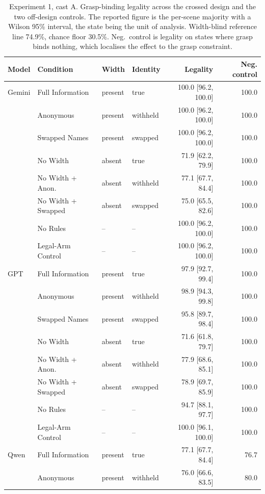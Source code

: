 \begin{table}[H]
  \centering
  \caption{Experiment 1, cast A. Grasp-binding legality across the crossed design and the two off-design controls. The reported figure is the per-scene majority with a Wilson 95\% interval, the state being the unit of analysis. Width-blind reference line 74.9\%, chance floor 30.5\%. Neg.\ control is legality on states where grasp binds nothing, which localises the effect to the grasp constraint.}
  \label{tab:ex1:design}
  \small
  \begin{tabular}{llllrr}
    \toprule
    Model & Condition & Width & Identity & Legality & Neg. control \\
    \midrule
    Gemini & Full Information & present & true & 100.0 [96.2, 100.0] & 100.0 \\
     & Anonymous & present & withheld & 100.0 [96.2, 100.0] & 100.0 \\
     & Swapped Names & present & swapped & 100.0 [96.2, 100.0] & 100.0 \\
     & No Width & absent & true & 71.9 [62.2, 79.9] & 100.0 \\
     & No Width + Anon. & absent & withheld & 77.1 [67.7, 84.4] & 100.0 \\
     & No Width + Swapped & absent & swapped & 75.0 [65.5, 82.6] & 100.0 \\
     & No Rules & -- & -- & 100.0 [96.2, 100.0] & 100.0 \\
     & Legal-Arm Control & -- & -- & 100.0 [96.2, 100.0] & 100.0 \\
    GPT & Full Information & present & true & 97.9 [92.7, 99.4] & 100.0 \\
     & Anonymous & present & withheld & 98.9 [94.3, 99.8] & 100.0 \\
     & Swapped Names & present & swapped & 95.8 [89.7, 98.4] & 100.0 \\
     & No Width & absent & true & 71.6 [61.8, 79.7] & 100.0 \\
     & No Width + Anon. & absent & withheld & 77.9 [68.6, 85.1] & 100.0 \\
     & No Width + Swapped & absent & swapped & 78.9 [69.7, 85.9] & 100.0 \\
     & No Rules & -- & -- & 94.7 [88.1, 97.7] & 100.0 \\
     & Legal-Arm Control & -- & -- & 100.0 [96.1, 100.0] & 100.0 \\
    Qwen & Full Information & present & true & 77.1 [67.7, 84.4] & 76.7 \\
     & Anonymous & present & withheld & 76.0 [66.6, 83.5] & 80.0 \\

\end{tabular}
\end{table}
